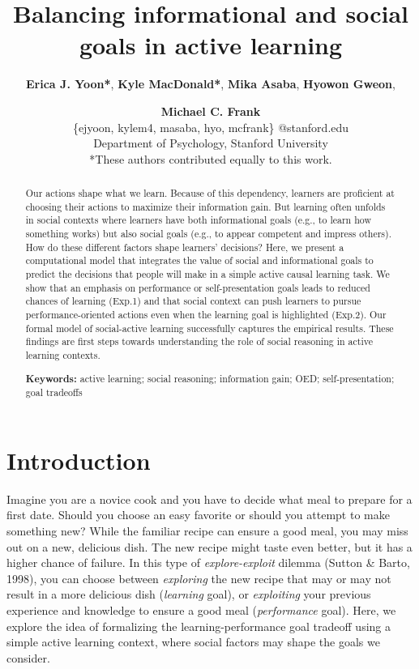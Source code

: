 \documentclass[10pt, letterpaper]{article}
\title{Balancing informational and social goals in active learning}
\author{{\large \bf Erica J. Yoon*}, {\large \bf Kyle MacDonald*}, {\large \bf Mika Asaba}, {\large \bf Hyowon Gweon}, \and {\large \bf Michael C. Frank} \\ \{ejyoon, kylem4, masaba, hyo, mcfrank\} @stanford.edu \\ Department of Psychology, Stanford University \\ *These authors contributed equally to this work.}
\begin{document}
\maketitle

\begin{abstract}
Our actions shape what we learn. Because of this dependency, learners
are proficient at choosing their actions to maximize their information
gain. But learning often unfolds in social contexts where learners have
both informational goals (e.g., to learn how something works) but also
social goals (e.g., to appear competent and impress others). How do
these different factors shape learners' decisions? Here, we present a
computational model that integrates the value of social and
informational goals to predict the decisions that people will make in a
simple active causal learning task. We show that an emphasis on
performance or self-presentation goals leads to reduced chances of
learning (Exp.1) and that social context can push learners to pursue
performance-oriented actions even when the learning goal is highlighted
(Exp.2). Our formal model of social-active learning successfully
captures the empirical results. These findings are first steps towards
understanding the role of social reasoning in active learning contexts.

\textbf{Keywords:}
active learning; social reasoning; information gain; OED;
self-presentation; goal tradeoffs
\end{abstract}

\section{Introduction}\label{introduction}

Imagine you are a novice cook and you have to decide what meal to
prepare for a first date. Should you choose an easy favorite or should
you attempt to make something new? While the familiar recipe can ensure
a good meal, you may miss out on a new, delicious dish. The new recipe
might taste even better, but it has a higher chance of failure. In this
type of \emph{explore-exploit} dilemma (Sutton \& Barto, 1998), you can
choose between \emph{exploring} the new recipe that may or may not
result in a more delicious dish (\emph{learning} goal), or
\emph{exploiting} your previous experience and knowledge to ensure a
good meal (\emph{performance} goal). Here, we explore the idea of
formalizing the learning-performance goal tradeoff using a simple active
learning context, where social factors may shape the goals we consider.
\end{document}
